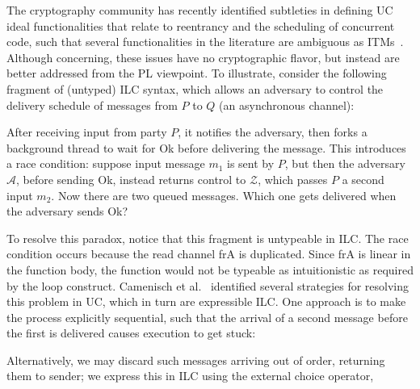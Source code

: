 The cryptography community has recently identified subtleties in defining UC ideal functionalities that relate to reentrancy and the scheduling of concurrent code, such that
several functionalities in the literature are ambiguous as ITMs~\cite{camenisch2016universal}.
Although concerning, these issues have no cryptographic flavor, but instead are better addressed from the PL viewpoint.
To illustrate, consider the following fragment of (untyped) ILC syntax, which allows an adversary to control the delivery schedule of messages from $P$ to $Q$ (an asynchronous channel):

After receiving input from party $P$, it
notifies the adversary, then forks a background thread to wait for \textsf{Ok} before
delivering the message.
This introduces a race condition: suppose input message $m_1$ is sent by $P$, but then the adversary $\mathcal A$, before sending \textsf{Ok}, instead returns control to $\mathcal Z$, which passes $P$ a second input $m_2$. Now there are two queued messages. Which one gets delivered when the adversary sends \textsf{Ok}?

To resolve this paradox, notice that this fragment is untypeable in ILC.
The race condition occurs because the read channel \textsf{frA} is duplicated.
Since \textsf{frA} is linear in the function body, the function would not be typeable as intuitionistic as required by the \textsf{loop} construct.
Camenisch et al.~\cite{camenisch2016universal} identified several strategies for resolving this problem in UC, which in turn are expressible ILC. One approach is to make the process explicitly sequential, such that the arrival of a second message before the first is delivered causes execution to get stuck:

Alternatively, we may discard such messages arriving out of order, returning them to sender; we express this in ILC using the external choice operator,


